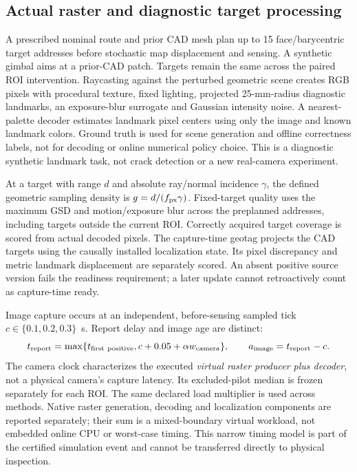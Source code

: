 \subsection{Actual raster and diagnostic target processing}
A prescribed nominal route and prior CAD mesh plan up to 15 face/barycentric target addresses before stochastic map displacement and sensing. A synthetic gimbal aims at a prior-CAD patch. Targets remain the same across the paired ROI intervention. Raycasting against the perturbed geometric scene creates RGB pixels with procedural texture, fixed lighting, projected 25-mm-radius diagnostic landmarks, an exposure-blur surrogate and Gaussian intensity noise. A nearest-palette decoder estimates landmark pixel centers using only the image and known landmark colors. Ground truth is used for scene generation and offline correctness labels, not for decoding or online numerical policy choice. This is a diagnostic synthetic landmark task, not crack detection or a new real-camera experiment.

At a target with range $d$ and absolute ray/normal incidence $\gamma$, the defined geometric sampling density is $g=d/(f_{\rm px}\gamma)$. Fixed-target quality uses the maximum GSD and motion/exposure blur across the preplanned addresses, including targets outside the current ROI. Correctly acquired target coverage is scored from actual decoded pixels. The capture-time geotag projects the CAD targets using the causally installed localization state. Its pixel discrepancy and metric landmark displacement are separately scored. An absent positive source version fails the readiness requirement; a later update cannot retroactively count as capture-time ready.

Image capture occurs at an independent, before-sensing sampled tick $c\in\{0.1,0.2,0.3\}$~s. Report delay and image age are distinct:
\begin{equation}
t_{\rm report}=\max\{t_{\rm first\ positive},c+0.05+\alpha w_{\rm camera}\},\qquad
a_{\rm image}=t_{\rm report}-c.\label{eq:r9-report}
\end{equation}
The camera clock characterizes the executed \emph{virtual raster producer plus decoder}, not a physical camera's capture latency. Its excluded-pilot median is frozen separately for each ROI. The same declared load multiplier is used across methods. Native raster generation, decoding and localization components are reported separately; their sum is a mixed-boundary virtual workload, not embedded online CPU or worst-case timing. This narrow timing model is part of the certified simulation event and cannot be transferred directly to physical inspection.
